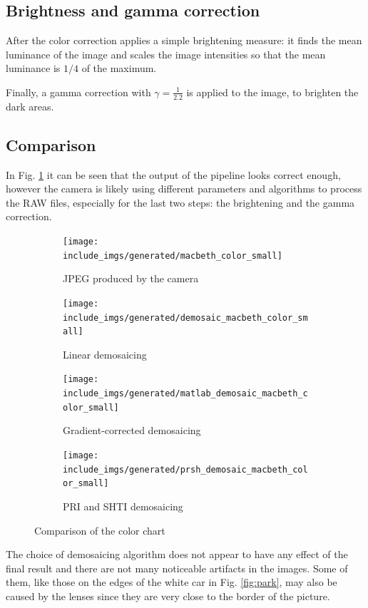 \documentclass[a4paper,oneside]{article}
\begin{document}
\subsection{Brightness and gamma correction}
After the color correction  applies a simple
brightening measure: it finds the mean luminance of the image and
scales the image intensities so that the mean luminance is $1/4$ of
the maximum.

Finally, a gamma correction with $\gamma = \frac{1}{2.2}$ is applied
to the image, to brighten the dark areas.

\subsection{Comparison}
In Fig. \ref{fig:chart} it can be seen that the output of the pipeline
looks correct enough, however the camera is likely using different
parameters and algorithms to process the RAW files, especially for the
last two steps: the brightening and the gamma correction.
\begin{figure}[htbp]
  \centering
  \begin{subfigure}{.4\textwidth}
    \centering
    \texttt{[image: include\_imgs/generated/macbeth\_color\_small]}
    \caption{JPEG produced by the camera}
  \end{subfigure}%
  \begin{subfigure}{.4\textwidth}
    \centering
    \texttt{[image: include\_imgs/generated/demosaic\_macbeth\_color\_small]}
    \caption{Linear demosaicing}
  \end{subfigure}
  \begin{subfigure}{.4\textwidth}
    \centering
    \texttt{[image: include\_imgs/generated/matlab\_demosaic\_macbeth\_color\_small]}
    \caption{Gradient-corrected demosaicing}
  \end{subfigure}%
  \begin{subfigure}{.4\textwidth}
    \centering
    \texttt{[image: include\_imgs/generated/prsh\_demosaic\_macbeth\_color\_small]}
    \caption{PRI and SHTI demosaicing}
  \end{subfigure}
  \caption{Comparison of the color chart}
  \label{fig:chart}
\end{figure}
The choice of demosaicing algorithm does not appear to have any effect
of the final result and there are not many noticeable artifacts in the
images. Some of them, like those on the edges of the white car in
Fig. \ref{fig:park}, may also be caused by the lenses since they are
very close to the border of the picture.
\end{document}
